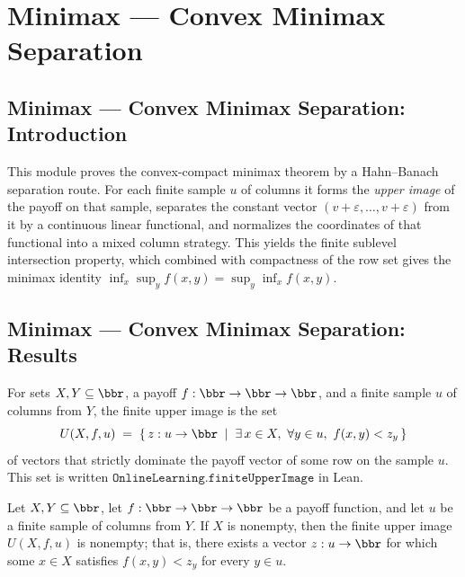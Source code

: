 \section{Minimax --- Convex Minimax Separation}
\subsection*{Minimax --- Convex Minimax Separation: Introduction}

This module proves the convex-compact minimax theorem by a Hahn--Banach separation
route. For each finite sample $u$ of columns it forms the \emph{upper image} of the
payoff on that sample, separates the constant vector $(v+\varepsilon,\dots,v+\varepsilon)$ from it
by a continuous linear functional, and normalizes the coordinates of that functional
into a mixed column strategy. This yields the finite sublevel intersection property,
which combined with compactness of the row set gives the minimax identity
$\inf_{x} \sup_{y} f(x,y) = \sup_{y} \inf_{x} f(x,y)$.

\subsection*{Minimax --- Convex Minimax Separation: Results}

\begin{definition}
\label{OnlineLearning.finiteUpperImage}
\leanok
For sets $X, Y \subseteq \bbr$, a payoff $f : \bbr \to \bbr \to \bbr$, and a finite
sample $u$ of columns from $Y$, the finite upper image is the set
\[
  U(X,f,u) \;=\; \{\, z : u \to \bbr \;\mid\; \exists\, x \in X,\ \forall y \in u,\ f(x,y) < z_y \,\}
\]
of vectors that strictly dominate the payoff vector of some row on the sample $u$.
This set is written $\texttt{OnlineLearning.finiteUpperImage}$ in Lean.
\end{definition}

\begin{lemma}
\label{OnlineLearning.finiteUpperImage_nonempty}
\leanok
{}
Let $X, Y \subseteq \bbr$, let $f : \bbr \to \bbr \to \bbr$ be a payoff function, and
let $u$ be a finite sample of columns from $Y$. If $X$ is nonempty, then the finite
upper image $U(X,f,u)$ is nonempty; that is, there exists a vector $z : u \to \bbr$ for
which some $x \in X$ satisfies $f(x,y) < z_y$ for every $y \in u$.
\end{lemma}

